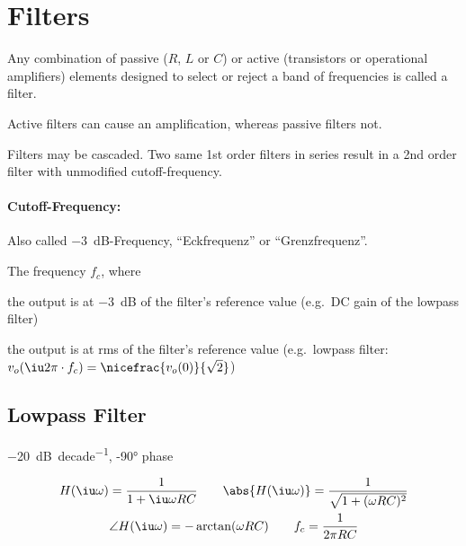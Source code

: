 
\section{Filters} %
	Any combination of passive ($R$, $L$ or $C$) or active (transistors or operational amplifiers) elements designed to select or reject a band of frequencies is called a filter.
	
	Active filters can cause an amplification, whereas passive filters not.
	
	Filters may be cascaded. Two same 1st order filters in series result in a 2nd order filter with unmodified cutoff-frequency.
	
	\begin{center}
	\end{center}
	
	\paragraph{Cutoff-Frequency:} %
		Also called \SI{-3}{\deci\bel}-Frequency, ``Eckfrequenz'' or ``Grenzfrequenz''.
		
		The frequency $f_c$, where
		\begin{tightitemize}
			\item the output is at \SI{-3}{\deci\bel} of the filter's reference value (e.g.~DC gain of the lowpass filter)
			\item the output is at rms of the filter's reference value (e.g.~lowpass filter: $v_o(\iu 2\pi \cdot f_c) = \nicefrac{v_o(0)}{\sqrt 2}$)
		\end{tightitemize}
	
	\subsection{Lowpass Filter} %
		\SI{-20}{\deci\bel\per{decade}}, \ang{-90} phase
		
		\begin{gather*}
			H(\iu \omega) = \frac{1}{1+\iu \omega R C} \qquad \abs{H(\iu \omega)} = \frac{1}{\sqrt{1+(\omega RC)^2}} \\
			\angle H(\iu \omega) = -\arctan(\omega R C) \qquad f_c = \frac{1}{2\pi R C}
		\end{gather*}

		\begin{center}
		\end{center}
	
